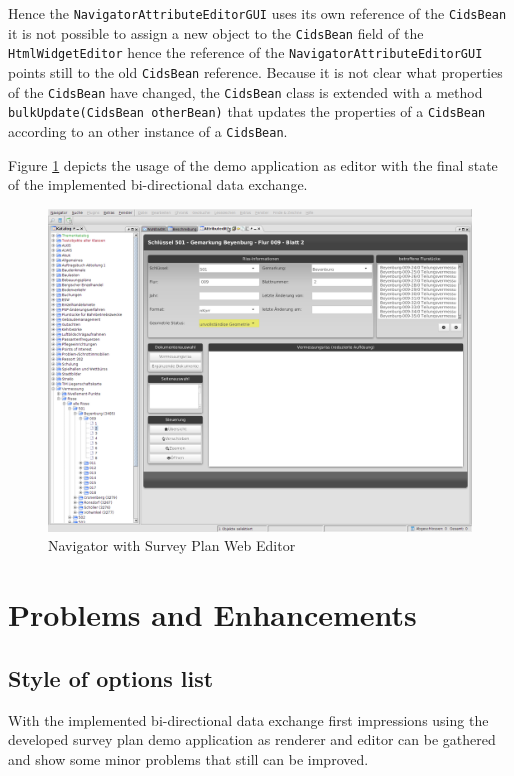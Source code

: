 Hence the \texttt{NavigatorAttributeEditorGUI} uses its own reference of the \texttt{CidsBean} it is not possible to assign a new object to the \texttt{CidsBean} field of the \texttt{HtmlWidgetEditor} hence the reference of the \texttt{NavigatorAttributeEditorGUI} points still to the old \texttt{CidsBean} reference. 
Because it is not clear what properties of the \texttt{CidsBean} have changed, the \texttt{CidsBean} class is extended with a method \texttt{bulkUpdate(CidsBean otherBean)} that updates the properties of a \texttt{CidsBean} according to an other instance of a \texttt{CidsBean}. 

Figure \ref{fig:nav_web_editor} depicts the usage of the demo application as editor with the final state of the implemented bi-directional data exchange.

\begin{figure}
	\centering	\includegraphics[width=1.0\textwidth]{./img/impl/navigator_web_editor.png}
	\caption{Navigator with Survey Plan Web Editor}
	\label{fig:nav_web_editor}
\end{figure}


\section{Problems and Enhancements}

\subsection{Style of options list}

With the implemented bi-directional data exchange first impressions using the developed survey plan demo application as renderer and editor can be gathered and show some minor problems that still can be improved.

